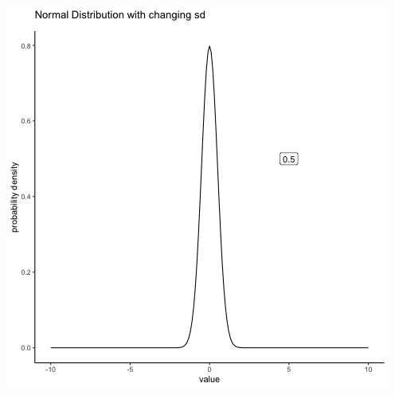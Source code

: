\documentclass[
]{book}
\begin{document}
\includegraphics{gifs/normalMovingSD-1.gif}
\end{document}
